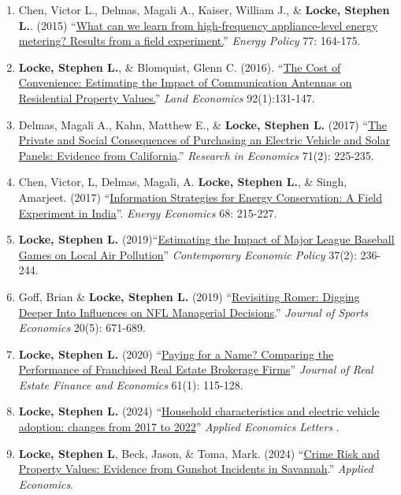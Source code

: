 \documentclass[10pt]{article}
\begin{document}
\begin{enumerate}
\item  Chen, Victor L., Delmas, Magali A., Kaiser, William J., \& \textbf{Locke, Stephen L.}. (2015) ``\href{http://www.sciencedirect.com/science/article/pii/S0301421514006296}{What can we learn from high-frequency appliance-level energy metering? Results from a field experiment.}''  \emph{Energy Policy} 77: 164-175. %
\item \textbf{Locke, Stephen L.}, \& Blomquist, Glenn C. (2016). ``\href{http://le.uwpress.org/content/92/1/131.short}{The Cost of Convenience: Estimating the Impact of Communication Antennas on Residential Property Values.}'' \emph{Land Economics} 92(1):131-147.  %
\item Delmas, Magali A., Kahn, Matthew E., \& \textbf{Locke, Stephen L.} (2017) ``\href{http://www.sciencedirect.com/science/article/pii/S109094431630254X}{The Private and Social Consequences of Purchasing an Electric Vehicle and Solar Panels:  Evidence from California}.'' \emph{Research in Economics} 71(2): 225-235. %
\item Chen, Victor, L, Delmas, Magali, A. \textbf{Locke, Stephen L.}, \& Singh, Amarjeet. (2017) ``\href{https://www.sciencedirect.com/science/article/pii/S0140988317303079}{Information Strategies for Energy Conservation:  A Field Experiment in India}''. \emph{Energy Economics} 68: 215-227. %
\item \textbf{Locke, Stephen L.} (2019)``\href{https://onlinelibrary.wiley.com/doi/full/10.1111/coep.12404}{Estimating the Impact of Major League Baseball Games on Local Air Pollution}'' \emph{Contemporary Economic Policy} 37(2): 236-244. %
\item Goff, Brian \& \textbf{Locke, Stephen L.} (2019) ``\href{http://journals.sagepub.com/doi/10.1177/1527002518798686}{Revisiting Romer: Digging Deeper Into Influences on NFL Managerial Decisions}.'' \emph{Journal of Sports Economics} 20(5): 671-689. %
\item \textbf{Locke, Stephen L.} (2020) ``\href{https://doi.org/10.1007/s11146-019-09702-2}{Paying for a Name? Comparing the Performance of Franchised Real Estate Brokerage Firms}'' \emph{Journal of Real Estate Finance and Economics} 61(1): 115-128. %
\item \textbf{Locke, Stephen L.} (2024) ``\href{https://doi.org/10.1080/13504851.2024.2386149}{Household characteristics and electric vehicle adoption: changes from 2017 to 2022}'' \emph{Applied Economics Letters} . %
\item \textbf{Locke, Stephen L}, Beck, Jason, \& Toma, Mark. (2024) ``\href{https://www.tandfonline.com/doi/full/10.1080/00036846.2024.2399816}{Crime Risk and Property Values: Evidence from Gunshot Incidents in Savannah}.'' \emph{Applied Economics}.
\end{enumerate}
\end{document}
